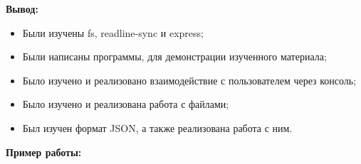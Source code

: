 \textbf{Вывод:}

\begin{itemize} 
	\item Были изучены fs, readline-sync и express;
	\item Были написаны программы, для демонстрации изученного материала;
	\item Было изучено и реализовано взаимодействие с пользователем через консоль;
	\item Было изучено и реализована работа с файлами;
	\item Был изучен формат JSON, а также реализована работа с ним.
\end{itemize}

\textbf{Пример работы:}

\begin{figure}[ht!]
\end{figure}

\begin{figure}[ht!]
\end{figure}

